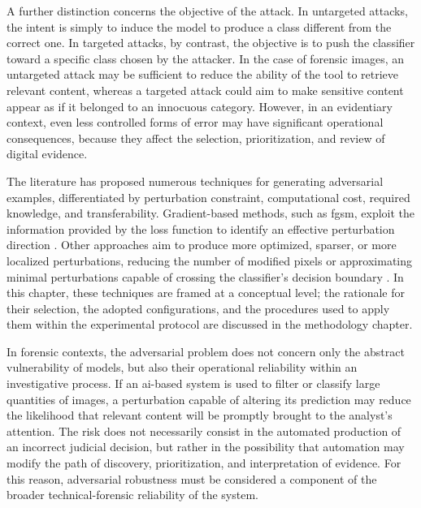 A further distinction concerns the objective of the attack. In untargeted
attacks, the intent is simply to induce the model to produce a class different
from the correct one. In targeted attacks, by contrast, the objective is to
push the classifier toward a specific class chosen by the attacker. In the case
of forensic images, an untargeted attack may be sufficient to reduce the
ability of the tool to retrieve relevant content, whereas a targeted attack
could aim to make sensitive content appear as if it belonged to an innocuous
category. However, in an evidentiary context, even less controlled forms of
error may have significant operational consequences, because they affect the
selection, prioritization, and review of digital evidence.

The literature has proposed numerous techniques for generating adversarial
examples, differentiated by perturbation constraint, computational cost,
required knowledge, and transferability. Gradient-based methods, such as
\gls{fgsm}, exploit the information provided by the loss function to identify
an effective perturbation direction \cite{goodfellow2015explaining}. Other
approaches aim to produce more optimized, sparser, or more localized
perturbations, reducing the number of modified pixels or approximating minimal
perturbations capable of crossing the classifier's decision boundary
\cite{carlini2017towards,su2019onepixel,moosavi2016deepfool,zhang2024superdeepfool}.
In this chapter, these techniques are framed at a conceptual level; the
rationale for their selection, the adopted configurations, and the procedures
used to apply them within the experimental protocol are discussed in the
methodology chapter.

In forensic contexts, the adversarial problem does not concern only the
abstract vulnerability of models, but also their operational reliability within
an investigative process. If an \gls{ai}-based system is used to filter or
classify large quantities of images, a perturbation capable of altering its
prediction may reduce the likelihood that relevant content will be promptly
brought to the analyst's attention. The risk does not necessarily consist in
the automated production of an incorrect judicial decision, but rather in the
possibility that automation may modify the path of discovery, prioritization,
and interpretation of evidence. For this reason, adversarial robustness must be
considered a component of the broader technical-forensic reliability of the
system.

